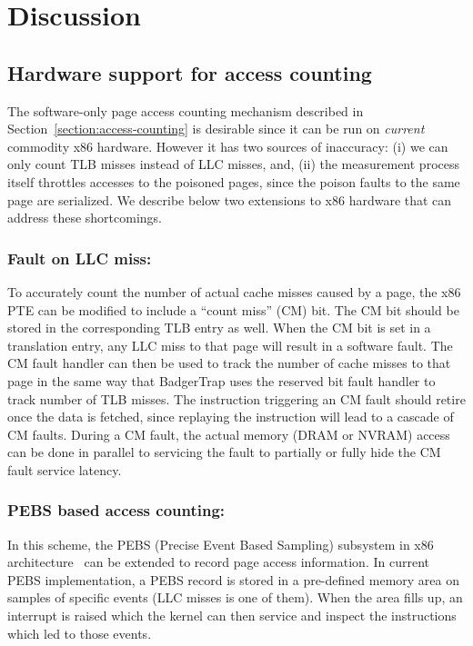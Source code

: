 \section{Discussion}
\label{discussion}

\subsection{Hardware support for access counting}
\label{counting_hardware}
The software-only page access counting mechanism described in
Section~\ref{section:access-counting} is desirable since it can be run on {\it
current} commodity x86 hardware. However it has two sources of inaccuracy: (i)
we can only count TLB misses instead of LLC misses, and, (ii) the measurement
process itself throttles accesses to the poisoned pages, since the poison faults
to the same page are serialized. We describe below two extensions to x86
hardware that can address these shortcomings.

\subsubsection{Fault on LLC miss:}
To accurately count the number of actual cache misses caused by a page, the x86
PTE can be modified to include a ``count miss'' (CM) bit. The CM bit
should be stored in the corresponding TLB entry as well. When the CM bit is
set in a translation entry, any LLC miss to that page will result in a software
fault. The CM fault handler can
then be used to track the number of cache misses to that page in the same way
that BadgerTrap uses the reserved bit fault handler to track number of TLB
misses.  The instruction triggering an CM fault should retire once the data is
fetched, since replaying the instruction will lead to a cascade of CM faults.
During a CM fault, the actual memory (DRAM or NVRAM) access can be done in
parallel to servicing the fault to partially or fully hide the CM fault service
latency.

\subsubsection{PEBS based access counting:}
In this scheme, the PEBS (Precise Event Based Sampling) subsystem in x86
architecture~\cite{Intel-sw-manual} can be extended to record page access information. In current PEBS
implementation, a PEBS record is stored in a pre-defined memory area on samples
of specific events (LLC misses is one of them). When the area fills up, an
interrupt is raised which the kernel can then service and inspect the
instructions which led to those events.

